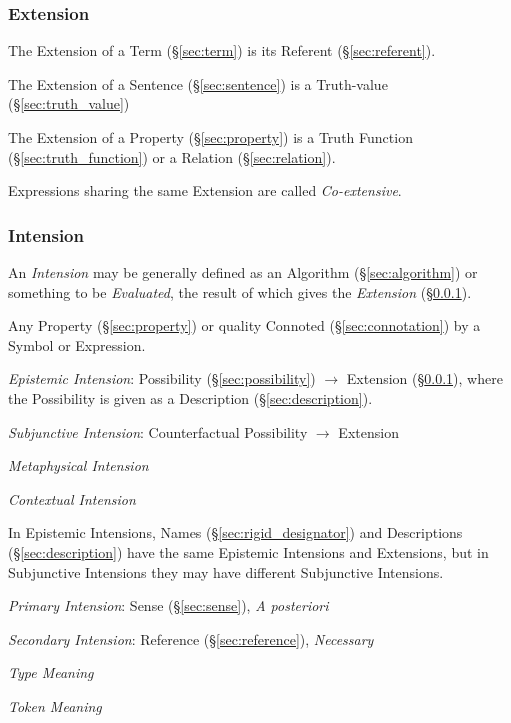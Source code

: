 \subsubsection{Extension}\label{sec:extension}\cite{chalmers02}

The Extension of a Term (\S\ref{sec:term}) is its Referent
(\S\ref{sec:referent}).

The Extension of a Sentence (\S\ref{sec:sentence}) is a Truth-value
(\S\ref{sec:truth_value})

The Extension of a Property (\S\ref{sec:property}) is a Truth Function
(\S\ref{sec:truth_function}) or a Relation (\S\ref{sec:relation}).

Expressions sharing the same Extension are called \emph{Co-extensive}.



\subsubsection{Intension}\label{sec:intension}\cite{chalmers02}

An \emph{Intension} may be generally defined as an Algorithm
(\S\ref{sec:algorithm}) or something to be \emph{Evaluated}, the
result of which gives the \emph{Extension} (\S\ref{sec:extension}).

Any Property (\S\ref{sec:property}) or quality Connoted
(\S\ref{sec:connotation}) by a Symbol or Expression.

\emph{Epistemic Intension}: Possibility (\S\ref{sec:possibility})
$\rightarrow$ Extension (\S\ref{sec:extension}), where the Possibility
is given as a Description (\S\ref{sec:description}).

\emph{Subjunctive Intension}: Counterfactual Possibility $\rightarrow$
Extension

\emph{Metaphysical Intension} %

\emph{Contextual Intension}

In Epistemic Intensions, Names (\S\ref{sec:rigid_designator}) and
Descriptions (\S\ref{sec:description}) have the same Epistemic
Intensions and Extensions, but in Subjunctive Intensions they may have
different Subjunctive Intensions.

\emph{Primary Intension}: Sense (\S\ref{sec:sense}), \emph{A
  posteriori}

\emph{Secondary Intension}: Reference (\S\ref{sec:reference}),
\emph{Necessary}

\emph{Type Meaning}

\emph{Token Meaning}



